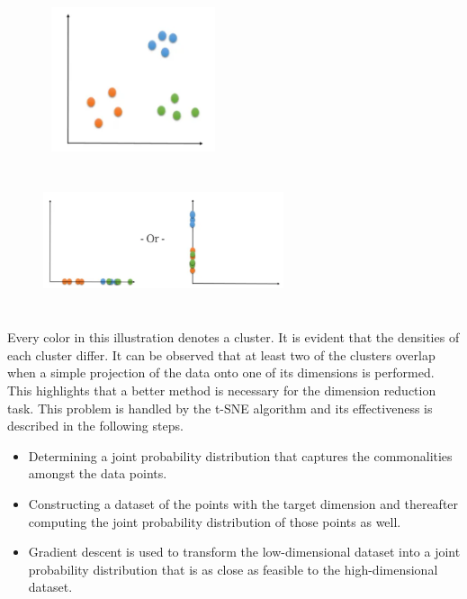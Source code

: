\begin{figure}
    \centering
    \begin{minipage}[t]{.45\textwidth}
      \centering
      \includegraphics[width=150pt,height=120pt]{pictures/2d_data.PNG}
      \label{fig:2d_data}
    \end{minipage}%
    \hspace{5mm}
    \begin{minipage}[t]{.45\textwidth}
      \centering
      \includegraphics[width=200pt,height=120pt]{pictures/1d_data.PNG}
      \label{fig:1d_data}
    \end{minipage}  
\end{figure}
Every color in this illustration denotes a cluster. It is evident that the densities of each cluster differ. It can be observed that at least two of the clusters overlap when a simple projection of the data onto one of its dimensions is performed. This highlights that a better method is necessary for the dimension reduction task. This problem is handled by the \ac{t-SNE} algorithm and its effectiveness is described in the following steps.
\begin{itemize}
    \item Determining a joint probability distribution that captures the commonalities amongst the data points.\cite{van2008visualizing}
    \item Constructing a dataset of the points with the target dimension and thereafter computing the joint probability distribution of those points as well.\cite{van2008visualizing}
    \item Gradient descent is used to transform the low-dimensional dataset into a joint probability distribution that is as close as feasible to the high-dimensional dataset.\cite{van2008visualizing}
\end{itemize}

